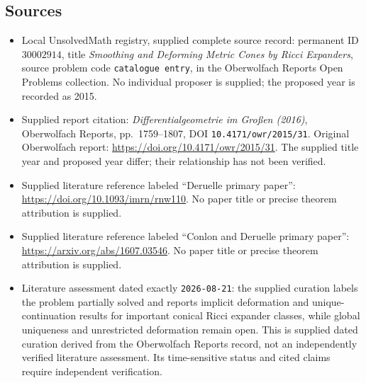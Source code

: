 \documentclass[11pt]{article}
\begin{document}
\subsection{Sources}
\begin{itemize}
\item Local UnsolvedMath registry, supplied complete source record: permanent ID \(30002914\), title \emph{Smoothing and Deforming Metric Cones by Ricci Expanders}, source problem code \texttt{catalogue entry}, in the Oberwolfach Reports Open Problems collection. No individual proposer is supplied; the proposed year is recorded as 2015.
\item Supplied report citation: \emph{Differentialgeometrie im Großen (2016)}, Oberwolfach Reports, pp.~1759--1807, DOI \texttt{10.4171/owr/2015/31}. Original Oberwolfach report: \url{https://doi.org/10.4171/owr/2015/31}. The supplied title year and proposed year differ; their relationship has not been verified.
\item Supplied literature reference labeled ``Deruelle primary paper'': \url{https://doi.org/10.1093/imrn/rnw110}. No paper title or precise theorem attribution is supplied.
\item Supplied literature reference labeled ``Conlon and Deruelle primary paper'': \url{https://arxiv.org/abs/1607.03546}. No paper title or precise theorem attribution is supplied.
\item Literature assessment dated exactly \texttt{2026-08-21}: the supplied curation labels the problem partially solved and reports implicit deformation and unique-continuation results for important conical Ricci expander classes, while global uniqueness and unrestricted deformation remain open. This is supplied dated curation derived from the Oberwolfach Reports record, not an independently verified literature assessment. Its time-sensitive status and cited claims require independent verification.
\end{itemize}
\end{document}
